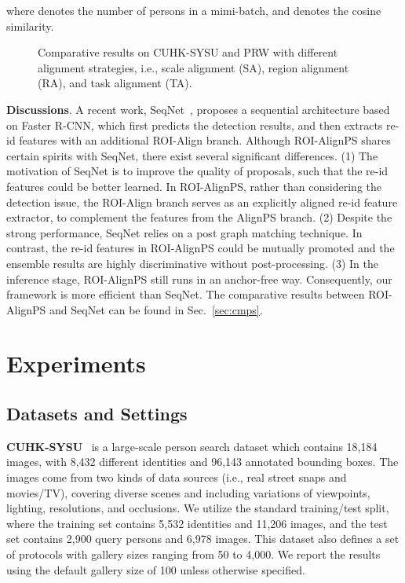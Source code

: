 \documentclass[journal]{IEEEtran}
\begin{document}
where  denotes the number of persons in a mimi-batch, and  denotes the cosine similarity.


\begin{figure*}[t]
\centering
{}
\hspace{2mm}
\centering
{}
\caption{Comparative results on CUHK-SYSU and PRW with different alignment strategies, i.e., scale alignment (SA), region alignment (RA), and task alignment (TA).}
\label{fig:baseline}
\end{figure*}


\textbf{Discussions}. A recent work, SeqNet~\cite{DBLP:conf/aaai/LiM21}, proposes a sequential architecture based on Faster R-CNN, which first predicts the detection results, and then extracts re-id features with an additional ROI-Align branch. Although ROI-AlignPS shares certain spirits with SeqNet, there exist several significant differences. (1) The motivation of SeqNet is to improve the quality of proposals, such that the re-id features could be better learned. In ROI-AlignPS, rather than considering the detection issue, the ROI-Align branch serves as an explicitly aligned re-id feature extractor, to complement the features from the AlignPS branch. (2) Despite the strong performance, SeqNet relies on a post graph matching technique. In contrast, the re-id features in ROI-AlignPS could be mutually promoted and the ensemble results are highly discriminative without post-processing. (3) In the inference stage, ROI-AlignPS still runs in an anchor-free way. Consequently, our framework is more efficient than SeqNet. The comparative results between ROI-AlignPS and SeqNet can be found in Sec.~\ref{sec:cmps}. 

\section{Experiments}



\subsection{Datasets and Settings}
\textbf{CUHK-SYSU}~\cite{DBLP:conf/cvpr/XiaoLWLW17} is a large-scale person search dataset which contains 18,184 images, with 8,432 different identities and 96,143 annotated bounding boxes. The images come from two kinds of data sources (i.e., real street snaps and movies/TV),
covering diverse scenes and including variations of viewpoints, lighting, resolutions, and occlusions.
We utilize the standard training/test split, where the training set contains 5,532 identities and 11,206 images, and the test set contains 2,900 query persons and 6,978 images. This dataset also defines a set of protocols with gallery sizes ranging from 50 to 4,000. We report the results using the default gallery size of 100 unless otherwise specified.
\end{document}
